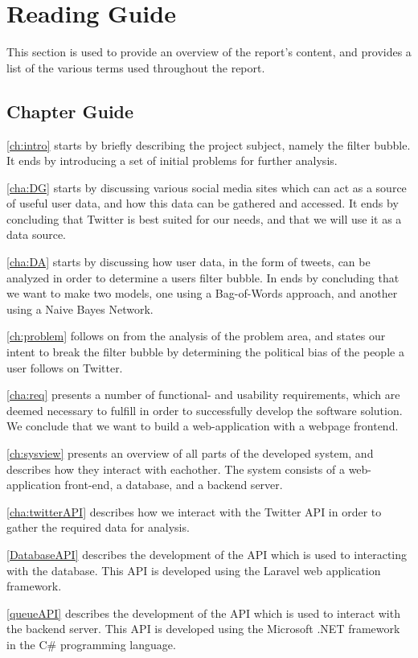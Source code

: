 \section{Reading Guide}\label{sec:readingGuide}
This section is used to provide an overview of the report's content, and
provides a list of the various terms used throughout the report. 

\subsection{Chapter Guide}
\autoref{ch:intro} starts by briefly describing the project subject, namely  the
filter bubble. It ends by introducing a set of initial problems for further
analysis.\nl

\autoref{cha:DG} starts by discussing various social media sites which can act
as a source of useful user data, and how this data can be gathered and accessed.
It ends by concluding that Twitter is best suited for our needs, and that we
will use it as a data source.\nl

\autoref{cha:DA} starts by discussing how user data, in the form of tweets, can
be analyzed in order to determine a users filter bubble. In ends by concluding
that we want to make two models, one using a Bag-of-Words approach, and another
using a Naive Bayes Network.\nl

\autoref{ch:problem} follows on from the analysis of the problem area, and
states our intent to break the filter bubble by determining the political bias
of the people a user follows on Twitter.\nl

\autoref{cha:req} presents a number of functional- and usability requirements,
which are deemed necessary to fulfill in order to successfully develop the
software solution. We conclude that we want to build a web-application with a
webpage frontend.\nl

\autoref{ch:sysview} presents an overview of all parts of the developed system,
and describes how they interact with eachother. The system consists of a
web-application front-end, a database, and a backend server.\nl

\autoref{cha:twitterAPI} describes how we interact with the Twitter API in order
to gather the required data for analysis.\nl

\autoref{DatabaseAPI} describes the development of the API which is used to
interacting with the database. This API is developed using the Laravel web
application framework.\nl

\autoref{queueAPI} describes the development of the API which is used to
interact with the backend server. This API is developed using the Microsoft
.NET framework in the C\# programming language.\nl

